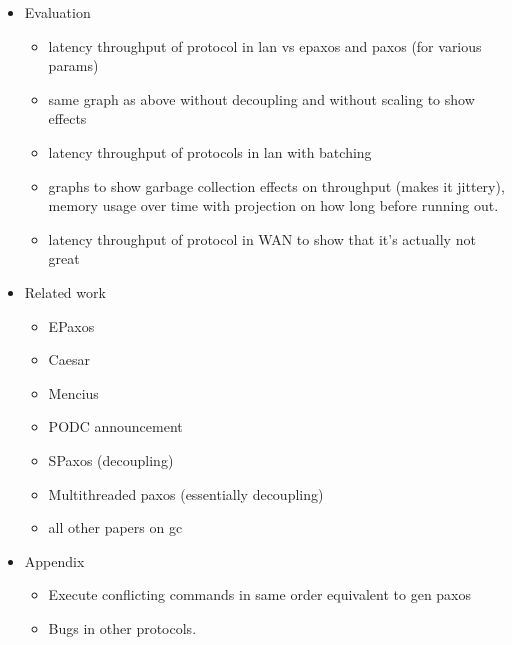 \begin{itemize}
  \item Evaluation
    \begin{itemize}
      \item
        latency throughput of protocol in lan vs epaxos and paxos (for various
        params)
      \item
        same graph as above without decoupling and without scaling to show
        effects
      \item
        latency throughput of protocols in lan with batching
      \item
        graphs to show garbage collection effects on throughput (makes it
        jittery), memory usage over time with projection on how long before
        running out.
      \item
        latency throughput of protocol in WAN to show that it's actually not
        great
    \end{itemize}

  \item Related work
    \begin{itemize}
      \item EPaxos
      \item Caesar
      \item Mencius
      \item PODC announcement
      \item SPaxos (decoupling)
      \item Multithreaded paxos (essentially decoupling)
      \item all other papers on gc
    \end{itemize}

  \item Appendix
    \begin{itemize}
      \item Execute conflicting commands in same order equivalent to gen paxos
      \item Bugs in other protocols.
    \end{itemize}
\end{itemize}
